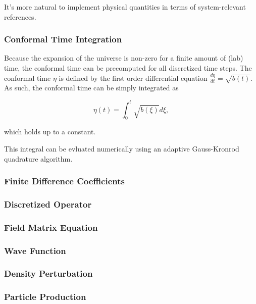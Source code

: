 \documentclass{article}
\begin{document}
            It's more natural to implement physical quantities in terms of system-relevant references.

        \subsubsection{Conformal Time Integration}

            Because the expansion of the universe is non-zero for a finite amount of (lab) time, the conformal time can be precomputed for all discretized time steps.  The conformal time $\eta$ is defined by the first order differential equation $\frac{d\eta}{dt} = \sqrt{b(t)}$.  As such, the conformal time can be simply integrated as 

            \begin{equation}
                \eta(t) = \int_{0}^{t} \sqrt{b(\xi)} d\xi,
            \end{equation}

            which holds up to a constant.

            This integral can be evluated numerically using an adaptive Gauss-Kronrod quadrature algorithm\cite{quadgk}.

        \subsubsection{Finite Difference Coefficients}

        \subsubsection{Discretized Operator}

        \subsubsection{Field Matrix Equation}

        \subsubsection{Wave Function}

        \subsubsection{Density Perturbation}

        \subsubsection{Particle Production}
\end{document}
